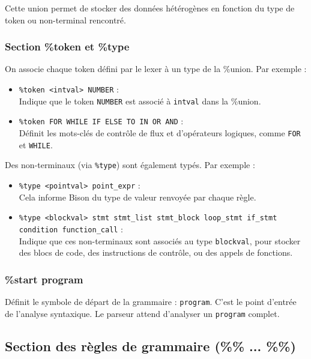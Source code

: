 \documentclass[12pt,a4paper]{article}
\begin{document}
Cette union permet de stocker des données hétérogènes en fonction du type de token ou non-terminal rencontré.

\subsubsection{Section \%token et \%type}

On associe chaque token défini par le lexer à un type de la \%union. Par exemple :

\begin{itemize}
    \item \texttt{\%token <intval> NUMBER} : \\
    Indique que le token \texttt{NUMBER} est associé à \texttt{intval} dans la \%union.

    \item \texttt{\%token FOR WHILE IF ELSE TO IN OR AND} : \\
    Définit les mots-clés de contrôle de flux et d’opérateurs logiques, comme \texttt{FOR} et \texttt{WHILE}.
\end{itemize}

Des non-terminaux (via \texttt{\%type}) sont également typés. Par exemple :

\begin{itemize}
    \item \texttt{\%type <pointval> point\_expr} : \\
    Cela informe Bison du type de valeur renvoyée par chaque règle.

    \item \texttt{\%type <blockval> stmt stmt\_list stmt\_block loop\_stmt if\_stmt condition function\_call} : \\
    Indique que ces non-terminaux sont associés au type \texttt{blockval}, pour stocker des blocs de code, des instructions de contrôle, ou des appels de fonctions.
\end{itemize}

\subsubsection{\%start program}

Définit le symbole de départ de la grammaire : \texttt{program}. C’est le point d’entrée de l’analyse syntaxique. Le parseur attend d’analyser un \texttt{program} complet.

\subsection{Section des règles de grammaire (\%\% ... \%\%)}
\end{document}
